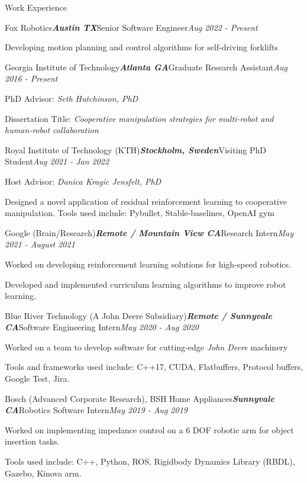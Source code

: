 \documentclass{resume} %
\begin{document}
\begin{rSection}{Work Experience}
\begin{rSubsection}{Fox Robotics}{\bf \em Austin TX}{Senior Software Engineer}{\em Aug 2022 - Present}
\item Developing motion planning and control algorithms for self-driving forklifts
\end{rSubsection}

\begin{rSubsection}{Georgia Institute of Technology}{\bf \em Atlanta GA}{Graduate Research Assistant}{\em Aug 2016 - Present}
\item PhD Advisor: {\em Seth Hutchinson, PhD}
\item Dissertation Title: {\em Cooperative manipulation strategies for multi-robot and human-robot collaboration}
\end{rSubsection}

\begin{rSubsection}{Royal Institute of Technology (KTH)}{\bf \em Stockholm, Sweden}{Visiting PhD Student}{\em Aug 2021 - Jan 2022}
\item Host Advisor: {\em Danica Kragic Jensfelt, PhD}
\item Designed a novel application of residual reinforcement learning to cooperative manipulation. Tools used include: Pybullet, Stable-baselines, OpenAI gym
\end{rSubsection}

\begin{rSubsection}{Google (Brain/Research)}{\bf \em Remote / Mountain View CA}{Research Intern}{\em May 2021 - August 2021}
\item Worked on developing reinforcement learning solutions for high-speed robotics.
\item Developed and implemented curriculum learning algorithms to improve robot learning.
\end{rSubsection}

\begin{rSubsection}{Blue River Technology (A John Deere Subsidiary)}{\bf \em Remote / Sunnyvale CA}{Software Engineering Intern}{\em May 2020 - Aug 2020}
\item Worked on a team to develop software for cutting-edge {\em John Deere} machinery
\item Tools and frameworks used include: C++17, CUDA, Flatbuffers, Protocol buffers, Google Test, Jira.
\end{rSubsection}

\begin{rSubsection}{Bosch (Advanced Corporate Research), BSH Home Appliances}{\bf \em Sunnyvale CA}{Robotics Software Intern}{\em May 2019 - Aug 2019}
\item Worked on implementing impedance control on a 6 DOF robotic arm for object insertion tasks.
\item Tools used include: C++, Python, ROS, Rigidbody Dynamics Library (RBDL), Gazebo, Kinova arm.
\end{rSubsection}


\end{rSection}
\end{document}
